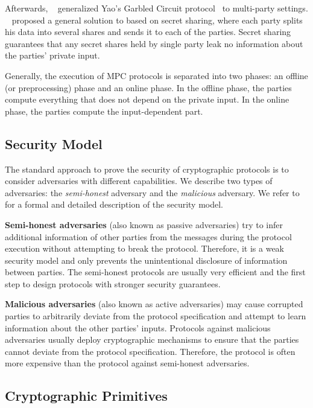 Afterwards, \bmr~\cite{beaver1990round} generalized Yao's Garbled Circuit protocol~\cite{yao1986generate} to multi-party settings. \gmw~\cite{goldreich1987play} proposed a general solution to \smpc based on secret sharing, where each party splits his data into several shares and sends it to each of the parties.
Secret sharing guarantees that any secret shares held by single party leak no information about the parties' private input.

Generally, the execution of MPC protocols is separated into two phases: an offline (or preprocessing) phase and an online phase.
In the offline phase, the parties compute everything that does not depend on the private input. In the online phase, the parties compute the input-dependent part.


\subsection{Security Model}
\label{subsec:SecurityModel}
The standard approach to prove the security of cryptographic protocols is to consider adversaries with different capabilities.
We describe two types of adversaries: the \textit{semi-honest} adversary and the \textit{malicious} adversary. We refer to~\cite[Chapter~2]{evans2017pragmatic} for a formal and detailed description of the security model.

\textbf{Semi-honest adversaries} (also known as passive adversaries) try to infer additional information of other parties from the messages during the protocol execution without attempting to break the protocol. Therefore, it is a weak security model and only prevents the unintentional disclosure of information between parties. The semi-honest protocols are usually very efficient and the first step to design protocols with stronger security guarantees.

\textbf{Malicious adversaries} (also known as active adversaries) may cause corrupted parties to arbitrarily deviate from the protocol specification and attempt to learn information about the other parties' inputs. Protocols against malicious adversaries usually deploy cryptographic mechanisms to ensure that the parties cannot deviate from the protocol specification. Therefore, the protocol is often more expensive than the protocol against semi-honest adversaries.

\subsection{Cryptographic Primitives}
\label{subsec:CryptographicPrimitivesforSecureMulti-PartyComputation}

